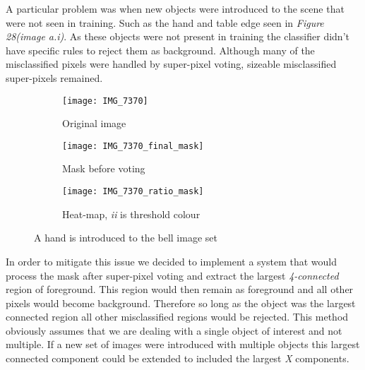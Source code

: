 \documentclass[12pt]{IIBproject}
\begin{document}
A particular problem was when new objects were introduced to the scene that were not seen in training. Such as the hand and table edge seen in \emph{Figure 28(image a.i)}. As these objects were not present in training the classifier didn't have specific rules to reject them as background. Although many of the misclassified pixels were handled by super-pixel voting, sizeable misclassified super-pixels remained.
\begin{figure}[H]
\centering
\begin{subfigure}{.33\textwidth}
  \centering
  \texttt{[image: IMG\_7370]}
  \caption{Original image}
  \label{fig:sub2}
\end{subfigure}
\begin{subfigure}{.33\textwidth}
  \centering
  \texttt{[image: IMG\_7370\_final\_mask]}
  \caption{Mask before voting}
  \label{fig:sub1}
\end{subfigure}%
\begin{subfigure}{.33\textwidth}
  \centering
  \texttt{[image: IMG\_7370\_ratio\_mask]}
  \caption{Heat-map, \emph{ii} is threshold colour}
  \label{fig:sub2}
\end{subfigure}

\caption{A hand is introduced to the bell image set}
\label{fig:test}
\end{figure}
In order to mitigate this issue we decided to implement a system that would process the mask after super-pixel voting and extract the largest \emph{4-connected} region of foreground. This region would then remain as foreground and all other pixels would become background. Therefore so long as the object was the largest connected region all other misclassified regions would be rejected. This method obviously assumes that we are dealing with a single object of interest and not multiple. If a new set of images were introduced with multiple objects this largest connected component could be extended to included the largest \emph{X} components. 
\end{document}
